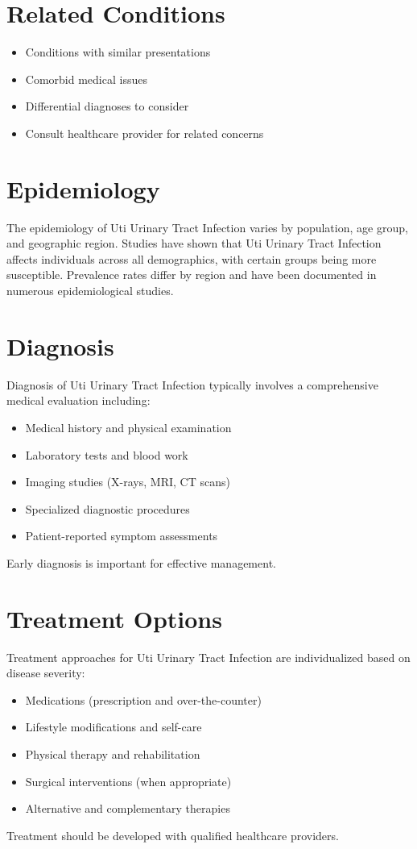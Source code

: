 \section*{Related Conditions}
\begin{itemize}
  \item Conditions with similar presentations
  \item Comorbid medical issues
  \item Differential diagnoses to consider
  \item Consult healthcare provider for related concerns
\end{itemize}

\section*{Epidemiology}
The epidemiology of Uti Urinary Tract Infection varies by population, age group, and geographic region. Studies have shown that Uti Urinary Tract Infection affects individuals across all demographics, with certain groups being more susceptible. Prevalence rates differ by region and have been documented in numerous epidemiological studies.

\section*{Diagnosis}
Diagnosis of Uti Urinary Tract Infection typically involves a comprehensive medical evaluation including:
\begin{itemize}
  \item Medical history and physical examination
  \item Laboratory tests and blood work
  \item Imaging studies (X-rays, MRI, CT scans)
  \item Specialized diagnostic procedures
  \item Patient-reported symptom assessments
\end{itemize}
Early diagnosis is important for effective management.

\section*{Treatment Options}
Treatment approaches for Uti Urinary Tract Infection are individualized based on disease severity:
\begin{itemize}
  \item Medications (prescription and over-the-counter)
  \item Lifestyle modifications and self-care
  \item Physical therapy and rehabilitation
  \item Surgical interventions (when appropriate)
  \item Alternative and complementary therapies
\end{itemize}
Treatment should be developed with qualified healthcare providers.

